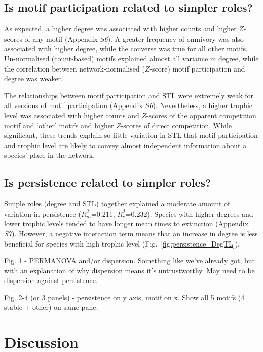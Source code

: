 \documentclass[12pt]{article}
\begin{document}
\begin{spacing}{2.0}
    \subsection*{Is motif participation related to simpler roles?}    
    
        As expected, a higher degree was associated with higher counts and higher $Z$-scores of any motif (Appendix \emph{S6}).
        A greater frequency of omnivory was also associated with higher degree, while the converse was true for all other motifs.
        Un-normalised (count-based) motifs explained almost all variance in degree, while the correlation between network-normalised ($Z$-score) motif participation and degree was weaker. 
        
    
        The relationships between motif participation and STL were extremely weak for all versions of motif participation (Appendix \emph{S6}).
        Nevertheless, a higher trophic level was associated with higher counts and $Z$-scores of the apparent competition motif and `other' motifs and higher $Z$-scores of direct competition.
        While significant, these trends explain so little variation in STL that motif participation and trophic level are likely to convey almost independent information about a species' place in the network.
    

    \subsection*{Is persistence related to simpler roles?}
    
        Simple roles (degree and STL) together explained a moderate amount of variation in persistence ($R^2_m$=0.211, $R^2_c$=0.232).
        Species with higher degrees and lower trophic levels tended to have longer mean times to extinction (Appendix \emph{S7}).
        However, a negative interaction term means that an increase in degree is less beneficial for species with high trophic level (Fig.~\ref{fig:persistence_DegTL}).
    
    
Fig. 1 - PERMANOVA and/or dispersion. Something like we've already got, but with an explanation of why dispersion means it's untrustworthy. May need to be dispersion against persistence.

Fig. 2-4 (or 3 panels) - persistence on y axis, motif on x. Show all 5 motifs (4 stable + other) on same pane.


\section*{Discussion}


\end{spacing}
\end{document}
